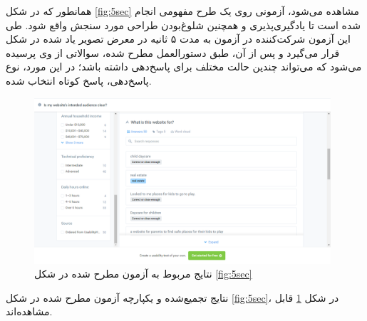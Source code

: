 همانطور که در شکل
\ref{fig:5sec}
مشاهده می‌شود، آزمونی روی یک طرح مفهومی انجام شده است تا یادگیری‌پذیری و همچنین شلوغ‌بودن طراحی مورد سنجش واقع شود. طی این آزمون شرکت‌کننده در آزمون به مدت ۵ ثانیه در معرض تصویر یاد شده در شکل قرار می‌گیرد و پس از آن، طبق دستورالعمل مطرح شده، سوالاتی از وی پرسیده می‌شود که می‌تواند چندین حالت مختلف برای پاسخ‌دهی داشته باشد؛ در این مورد، نوع پاسخ‌دهی، پاسخ کوتاه انتخاب شده.
\begin{figure}
	\centering
	\includegraphics[width=11cm]{Resources/res1.PNG}
	\caption{نتایج مربوط به آزمون مطرح شده در شکل \ref{fig:5sec}}
	\label{fig:res}
\end{figure}
نتایج تجمیع‌شده و یکپارچه آزمون مطرح شده در شکل
\ref{fig:5sec}،
در شکل
\ref{fig:res}
قابل مشاهده‌اند.
